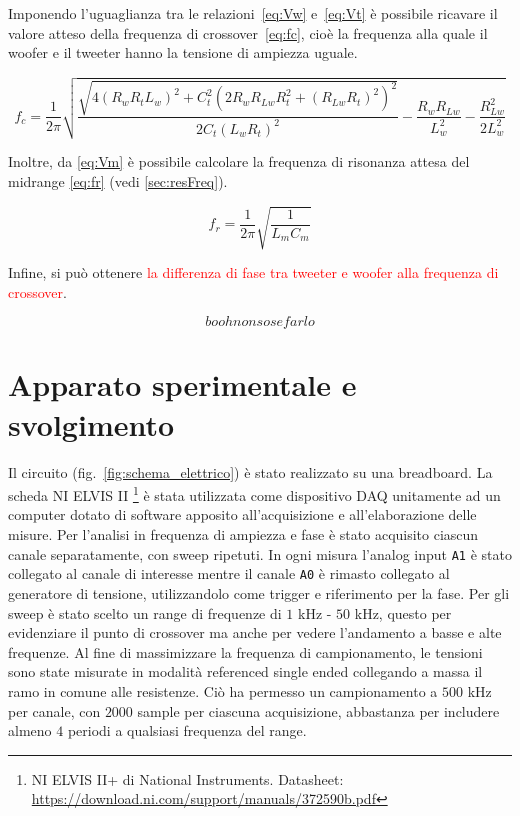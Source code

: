 \documentclass[12pt,italian]{article}
\newcommand{\err}[1]{\textcolor{red}{#1}}
\begin{document}
Imponendo l'uguaglianza tra le relazioni~\eqref{eq:Vw} e~\eqref{eq:Vt} è
possibile ricavare il valore atteso della frequenza di crossover~\eqref{eq:fc},
cioè la frequenza alla quale il woofer e il tweeter hanno la tensione di
ampiezza uguale.

\begin{equation}
	f_{c} = \frac{1}{2\pi}\sqrt{\frac{\sqrt{4 (R_{w} R_{t} L_{w})^2 + C_{t}^2(2
				R_{w} R_{Lw} R_{t}^2 + (R_{Lw} R_{t})^2)^2}}{2 C _{t} (L_{w} R_{t})^2 } -
		\frac{R_{w} R_{Lw}}{L_{w}^2} - \frac{R_{Lw}^2}{2 L_{w}^2}}
	\label{eq:fc}
\end{equation}

Inoltre, da \eqref{eq:Vm} è possibile calcolare la frequenza di risonanza
attesa del midrange \eqref{eq:fr} (vedi \cref{sec:resFreq}).

\begin{equation}
	f_{r} = \frac{1}{2\pi}\sqrt{\frac{1}{L_{m} C_{m}}}  %
	\label{eq:fr}
\end{equation}

Infine, si può ottenere \err{la differenza di fase tra tweeter e woofer alla
	frequenza di crossover}.

\begin{equation}
	booh non so se farlo
\end{equation}

\section*{Apparato sperimentale e svolgimento}

Il circuito (fig.~\ref{fig:schema_elettrico}) è stato realizzato su una
breadboard. La scheda NI ELVIS II \footnote{NI ELVIS II+ di National
	Instruments. Datasheet:
	\url{https://download.ni.com/support/manuals/372590b.pdf}} è stata utilizzata
come dispositivo DAQ unitamente ad un computer dotato di software apposito
all'acquisizione e all'elaborazione delle misure. Per l'analisi in frequenza di
ampiezza e fase è stato acquisito ciascun canale separatamente, con sweep
ripetuti. In ogni misura l'analog input \texttt{A1} è stato collegato al canale
di interesse mentre il canale \texttt{A0} è rimasto collegato al generatore di
tensione, utilizzandolo come trigger e riferimento per la fase. Per gli sweep è
stato scelto un range di frequenze di $1$ kHz - $50$ kHz, questo per
evidenziare il punto di crossover ma anche per vedere l'andamento a basse e
alte frequenze. Al fine di massimizzare la frequenza di campionamento, le
tensioni sono state misurate in modalità referenced single ended collegando a
massa il ramo in comune alle resistenze. Ciò ha permesso un campionamento a
$500$ kHz per canale, con $2000$ sample per ciascuna acquisizione, abbastanza
per includere almeno $4$ periodi a qualsiasi frequenza del range.
\end{document}
